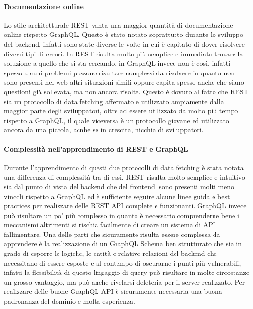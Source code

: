 \paragraph{Documentazione online}
Lo stile architetturale REST vanta una maggior quantità di documentazione online rispetto GraphQL. Questo è stato notato soprattutto durante lo sviluppo del backend, infatti sono state diverse le volte in cui è capitato di dover risolvere diversi tipi di errori. In REST risulta molto più semplice e immediato trovare la soluzione a quello che si sta cercando, in GraphQL invece non è così, infatti spesso alcuni problemi possono risultare complessi da risolvere in quanto non sono presenti nel web altri situazioni simili oppure capita spesso anche che siano questioni già sollevata, ma non ancora risolte. Questo è dovuto al fatto che REST sia un protocollo di data fetching affermato e utilizzato ampiamente dalla maggior parte degli sviluppatori, oltre ad essere utilizzato da molto più tempo rispetto a GraphQL, il quale viceversa è un protocollo giovane ed utilizzato ancora da una piccola, acnhe se in crescita, nicchia di sviluppatori.
\paragraph{Complessità nell'apprendimento di REST e GraphQL}
Durante l'apprendimento di questi due protocolli di data fetching è stata notata una differenza di complessità tra di essi. REST risulta molto semplice e intuitivo sia dal punto di vista del backend che del frontend, sono presenti molti meno vincoli rispetto a GraphQL ed è sufficiente seguire alcune linee guida e best practices per realizzare delle REST API complete e funzionanti. GraphQL invece può risultare un po' più complesso in quanto è necessario comprenderne bene i meccanismi altrimenti si rischia facilmente di creare un sistema di API fallimentare. Una delle parti che sicuramente risulta essere complessa da apprendere è la realizzazione di un GraphQL Schema ben strutturato che sia in grado di esporre le logiche, le entità e relative relazioni del backend che necessitano di essere esposte e al contempo di oscurarne i punti più vulnerabili, infatti la flessibilità di questo lingaggio di query può risultare in molte circostanze un grosso vantaggio, ma può anche rivelarsi deleteria per il server realizzato. Per realizzare delle buone GraphQL API è sicuramente necessaria una buona padronanza del dominio e molta esperienza.
